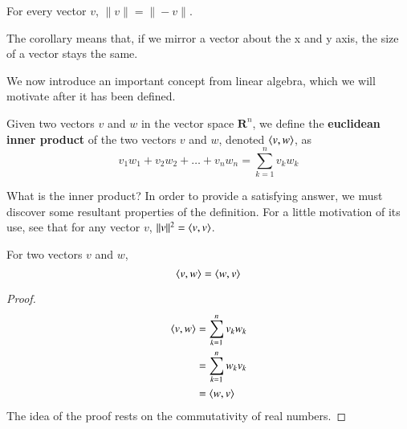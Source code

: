 \begin{center}

\theoremstyle{definition}
\end{center}

\begin{corollary}
  For every vector $v$, $\| v \| = \| -v \|$.
\end{corollary}

The corollary means that, if we mirror a vector about the x and y axis, the size of a vector stays the same.

\begin{center}
\end{center}

We now introduce an important concept from linear algebra, which we will motivate after it has been defined.

\begin{definition}
Given two vectors $v$ and $w$ in the vector space $\mathbf{R}^n$, we define the {\bf euclidean inner product} of the two vectors $v$ and $w$, denoted $\langle v, w\rangle$, as
%
\[ v_1w_1 + v_2w_2 + \dots + v_nw_n = \sum_{k = 1}^n v_k w_k \]
\end{definition}

What is the inner product? In order to provide a satisfying answer, we must discover some resultant properties of the definition. For a little motivation of its use, see that for any vector $v$, $\|v\|^2 = \langle v, v\rangle$.

\begin{lemma}
  For two vectors $v$ and $w$,
  \[ \langle v, w\rangle = \langle w, v\rangle \]
\end{lemma}
\begin{proof}
  \begin{align*}
    \langle v, w\rangle &= \sum_{k=1}^n v_k w_k\\
                 &= \sum_{k=1}^n w_k v_k\\
                 &= \langle w, v\rangle
  \end{align*}
  The idea of the proof rests on the commutativity of real numbers.
\end{proof}

